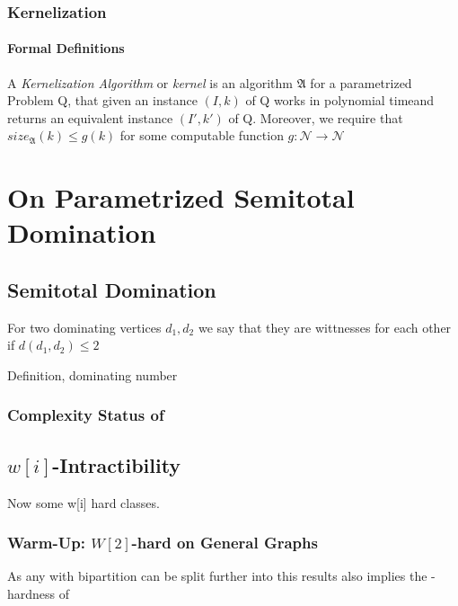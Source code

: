 \subsection{Kernelization}
\subsubsection{Formal Definitions}
\begin{definition}
A \textit{Kernelization Algorithm} or \textit{kernel} is an algorithm $\mathfrak{A}$ for a parametrized Problem Q, that given an instance $(I,k)$ of Q works in polynomial timeand returns an equivalent instance $(I', k')$ of Q. Moreover, we require that $size_{\mathfrak{A}}(k) \leq g(k)$ for some computable function $g:\mathcal{N} \rightarrow \mathcal{N}$
\end{definition}


\chapter{On Parametrized Semitotal Domination}
\section{Semitotal Domination}

\sdom

For two dominating vertices $d_1, d_2$ we say that they are wittnesses for each other if $d(d_1, d_2) \leq 2$


Definition, dominating number

\subsection*{Complexity Status of \sdom}

\section{\hmath $w[i]$-Intractibility}

Now some  w[i] hard classes. 

\subsection{Warm-Up: \hmath $W[2]$-hard on General Graphs}


As any \bg with bipartition can be split further into \rpg this results also implies the \wone-hardness of \rpg

